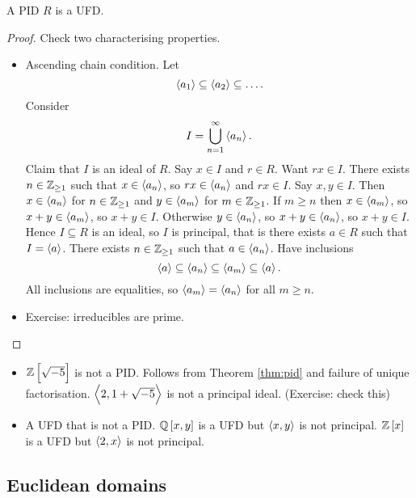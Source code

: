 \begin{theorem}
\label{thm:pid}
A PID $ R $ is a UFD.
\end{theorem}

\begin{proof}
Check two characterising properties.
\begin{itemize}
\item Ascending chain condition. Let
$$ \left\langle a_1 \right\rangle \subseteq \left\langle a_2 \right\rangle \subseteq \dots. $$
Consider
$$ I = \bigcup_{n = 1}^\infty \left\langle a_n \right\rangle. $$
Claim that $ I $ is an ideal of $ R $. Say $ x \in I $ and $ r \in R $. Want $ rx \in I $. There exists $ n \in \mathbb{Z}_{\ge 1} $ such that $ x \in \left\langle a_n \right\rangle $, so $ rx \in \left\langle a_n \right\rangle $ and $ rx \in I $. Say $ x, y \in I $. Then $ x \in \left\langle a_n \right\rangle $ for $ n \in \mathbb{Z}_{\ge 1} $ and $ y \in \left\langle a_m \right\rangle $ for $ m \in \mathbb{Z}_{\ge 1} $. If $ m \ge n $ then $ x \in \left\langle a_m \right\rangle $, so $ x + y \in \left\langle a_m \right\rangle $, so $ x + y \in I $. Otherwise $ y \in \left\langle a_n \right\rangle $, so $ x + y \in \left\langle a_n \right\rangle $, so $ x + y \in I $. Hence $ I \subseteq R $ is an ideal, so $ I $ is principal, that is there exists $ a \in R $ such that $ I = \left\langle a \right\rangle $. There exists $ n \in \mathbb{Z}_{\ge 1} $ such that $ a \in \left\langle a_n \right\rangle $. Have inclusions
$$ \left\langle a \right\rangle \subseteq \left\langle a_n \right\rangle \subseteq \left\langle a_m \right\rangle \subseteq \left\langle a \right\rangle. $$
All inclusions are equalities, so $ \left\langle a_m \right\rangle = \left\langle a_n \right\rangle $ for all $ m \ge n $.
\item Exercise: irreducibles are prime.
\end{itemize}
\end{proof}

\begin{remark*}
\hfill
\begin{itemize}
\item $ \Z\sbr{\sqrt{-5}} $ is not a PID. Follows from Theorem \ref{thm:pid} and failure of unique factorisation. $ \left\langle 2, 1 + \sqrt{-5} \right\rangle $ is not a principal ideal. (Exercise: check this)
\item A UFD that is not a PID. $ \Q\sbr{x, y} $ is a UFD but $ \left\langle x, y \right\rangle $ is not principal. $ \Z\sbr{x} $ is a UFD but $ \left\langle 2, x \right\rangle $ is not principal.
\end{itemize}
\end{remark*}

\pagebreak

\subsection{Euclidean domains}

